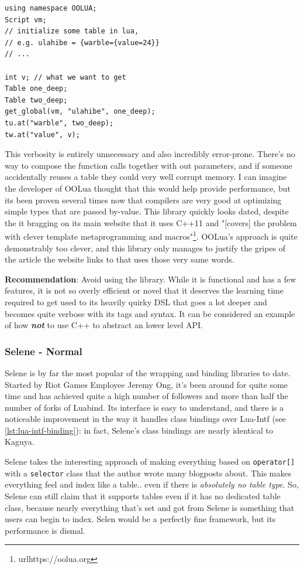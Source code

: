 \documentclass[conference,compsoc]{IEEEtran}
\begin{document}
\begin{lstlisting}
using namespace OOLUA;
Script vm;
// initialize some table in lua, 
// e.g. ulahibe = {warble={value=24}}
// ...

int v; // what we want to get
Table one_deep;
Table two_deep;
get_global(vm, "ulahibe", one_deep);
tu.at("warble", two_deep);
tw.at("value", v);
\end{lstlisting}

This verbosity is entirely unnecessary and also incredibly error-prone. There's no way to compose the function calls together with out parameters, and if someone accidentally reuses a table they could very well corrupt memory. I can imagine the developer of OOLua thought that this would help provide performance, but its been proven several times now that compilers are very good at optimizing simple types that are passed by-value\cite{efficient-c++}. This library quickly looks dated, despite the it bragging on its main website that it uses C++11 and "[covers] the problem with clever template metaprogramming and macros"\footnote{url{https://oolua.org}}. OOLua's approach is quite demonstrably too clever, and this library only manages to justify the gripes of the article the website links to that uses those very same words.

\textbf{Recommendation}: Avoid using the library. While it is functional and has a few features, it is not so overly efficient or novel that it deserves the learning time required to get used to its heavily quirky DSL that goes a lot deeper and becomes quite verbose with its tags and syntax. It can be considered an example of how \textbf{\emph{not}} to use C++ to abstract an lower level API.

\subsubsection{Selene - Normal}

Selene\cite{selene} is by far the most popular of the wrapping and binding libraries to date. Started by Riot Games Employee Jeremy Ong, it's been around for quite some time and has achieved quite a high number of followers and more than half the number of forks of Luabind. Its interface is easy to understand, and there is a noticeable improvement in the way it handles class bindings over Lua-Intf (see \cref{lst:lua-intf-binding}): in fact, Selene's class bindings are nearly identical to Kaguya.

Selene takes the interesting approach of making everything based on \lstinline|operator[]| with a \lstinline|selector| class that the author wrote many blogposts about. This makes everything feel and index like a table.. even if there is \emph{absolutely no table type}. So, Selene can still claim that it supports tables even if it has no dedicated table class, because nearly everything that's set and got from Selene is something that users can begin to index. Selen would be a perfectly fine framework, but its performance is dismal.
\end{document}
